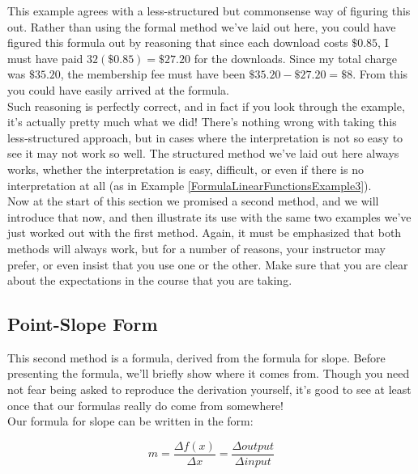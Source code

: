 \bigskip

This example agrees with a less-structured but commonsense way of figuring this out. Rather than using the formal method we’ve laid out here, you could have figured this formula out by reasoning that since each download costs $\$0.85$, I must have paid $32(\$0.85)=\$27.20$ for the downloads.  Since my total charge was $\$35.20$, the membership fee must have been $\$35.20-\$27.20 = \$8$.  From this you could have easily arrived at the formula.\\

Such reasoning is perfectly correct, and in fact if you look through the example, it’s actually pretty much what we did! There’s nothing wrong with taking this less-structured approach, but in cases where the interpretation is not so easy to see it may not work so well. The structured method we’ve laid out here always works, whether the interpretation is easy, difficult, or even if there is no interpretation at all (as in Example \ref{FormulaLinearFunctionsExample3}).\\


Now at the start of this section we promised a second method, and we will introduce that now, and then illustrate its use with the same two examples we’ve just worked out with the first method.  Again, it must be emphasized that both methods will always work, but for a number of reasons, your instructor may prefer, or even insist that you use one or the other. Make sure that you are clear about the expectations in the course that you are taking.

%
%

\subsection{Point-Slope Form}

This second method is a formula, derived from the formula for slope. Before presenting the formula, we’ll briefly show where it comes from. Though you need not fear being asked to reproduce the derivation yourself, it’s good to see at least once that our formulas really do come from somewhere!\\

Our formula for slope  can be written in the form:  

$$m=\frac{\Delta f(x)}{\Delta x} = \frac{\Delta output}{\Delta input}$$

